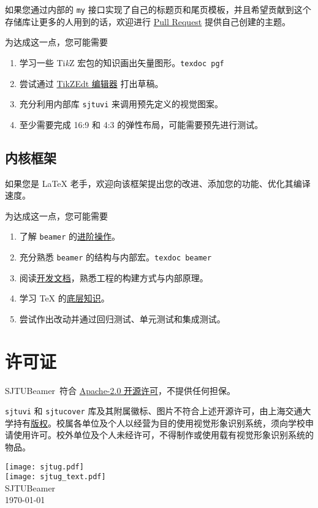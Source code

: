 \documentclass[
    UTF8,
    heading=true,
    12pt,
    a4paper
]{ctexrep}
\def\themename{\textsf{SJTUBeamer}}
\begin{document}
如果您通过内部的 \texttt{my} 接口实现了自己的标题页和尾页模板，并且希望贡献到这个存储库让更多的人用到的话，欢迎进行 \href{https://github.com/sjtug/SJTUBeamer/pulls}{Pull Request} 提供自己创建的主题。

为达成这一点，您可能需要
\begin{enumerate}
  \item 学习一些 Ti\textit{k}Z 宏包的知识画出矢量图形。\texttt{texdoc pgf}
  \item 尝试通过 \href{https://code.google.com/archive/p/tikzedt/downloads}{TikZEdt 编辑器} 打出草稿。
  \item 充分利用内部库 \texttt{sjtuvi} 来调用预先定义的视觉图案。
  \item 至少需要完成 16:9 和 4:3 的弹性布局，可能需要预先进行测试。
\end{enumerate}

\section{内核框架}

如果您是 \LaTeX{} 老手，欢迎向该框架提出您的改进、添加您的功能、优化其编译速度。

为达成这一点，您可能需要
\begin{enumerate}
  \item 了解 \texttt{beamer} 的\href{https://latex-beamer.com/}{进阶操作}。
  \item 充分熟悉 \texttt{beamer} 的结构与内部宏。\texttt{texdoc beamer}
  \item 阅读\href{run:sjtubeamerdevguide.pdf}{开发文档}，熟悉工程的构建方式与内部原理。
  \item 学习 \TeX{} 的\href{https://mirrors.sjtug.sjtu.edu.cn/CTAN/graphics/pgf/contrib/pgfplots/doc/TeX-programming-notes.pdf}{底层知识}。
  \item 尝试作出改动并通过回归测试、单元测试和集成测试。
\end{enumerate}


\chapter*{许可证}

\themename\ 符合 \href{https://github.com/sjtug/SJTUBeamer/blob/main/LICENSE}{Apache-2.0 开源许可}，不提供任何担保。

\texttt{sjtuvi} 和 \texttt{sjtucover} 库及其附属徽标、图片不符合上述开源许可，由上海交通大学持有\href{https://vi.sjtu.edu.cn/index.php/articles/bulletin/16}{版权}。校属各单位及个人以经营为目的使用视觉形象识别系统，须向学校申请使用许可。校外单位及个人未经许可，不得制作或使用载有视觉形象识别系统的物品。

\def\sjtuglogo{
  \texttt{[image: sjtug.pdf]}\\
  \vspace*{5pt}
  \texttt{[image: sjtug\_text.pdf]}
}

\vfill
{
\centering
\sjtuglogo\\
{\large \themename{}\\}
\today\\
}
\vfill
\end{document}

